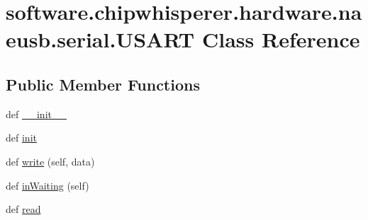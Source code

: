\hypertarget{classsoftware_1_1chipwhisperer_1_1hardware_1_1naeusb_1_1serial_1_1USART}{}\section{software.\+chipwhisperer.\+hardware.\+naeusb.\+serial.\+U\+S\+A\+R\+T Class Reference}
\label{classsoftware_1_1chipwhisperer_1_1hardware_1_1naeusb_1_1serial_1_1USART}
\subsection*{Public Member Functions}
\begin{DoxyCompactItemize}
\item 
def \hyperlink{classsoftware_1_1chipwhisperer_1_1hardware_1_1naeusb_1_1serial_1_1USART_a1ea1fde621ac1ff23066afd8191db544}{\+\_\+\+\_\+init\+\_\+\+\_\+}
\item 
def \hyperlink{classsoftware_1_1chipwhisperer_1_1hardware_1_1naeusb_1_1serial_1_1USART_ab49728835a983f104ff02f074fa7a97b}{init}
\item 
def \hyperlink{classsoftware_1_1chipwhisperer_1_1hardware_1_1naeusb_1_1serial_1_1USART_a02c1a244b56095e5798744206d84961e}{write} (self, data)
\item 
def \hyperlink{classsoftware_1_1chipwhisperer_1_1hardware_1_1naeusb_1_1serial_1_1USART_aef4f297c06f49a74f7ce61981c225bfe}{in\+Waiting} (self)
\item 
def \hyperlink{classsoftware_1_1chipwhisperer_1_1hardware_1_1naeusb_1_1serial_1_1USART_a6bdeea131ad3f92ed6cd39f9c5c7c60d}{read}
\end{DoxyCompactItemize}
